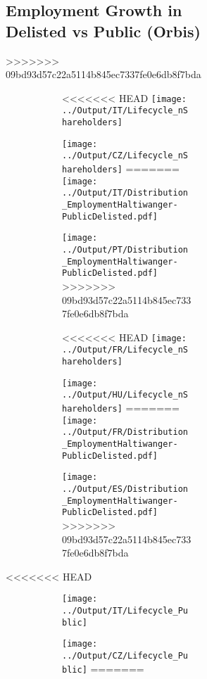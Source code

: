 \documentclass[12pt,notitlepage]{article}
\begin{document}
\begin{figure}[!htpb]
\begin{subfigure}{.49\textwidth}
\subsection{Employment Growth in Delisted vs Public (Orbis)}
>>>>>>> 09bd93d57c22a5114b845ec7337fe0e6db8f7bda
\begin{figure}[!htpb]
\centering
\caption{Firm age and Number of Shareholders}
\begin{subfigure}{.49\textwidth}
    \centering
<<<<<<< HEAD
 \texttt{[image: ../Output/IT/Lifecycle\_nShareholders]}
\end{subfigure}%
\begin{subfigure}{.49\textwidth}
    \centering
 \texttt{[image: ../Output/CZ/Lifecycle\_nShareholders]}
=======
 \texttt{[image: ../Output/IT/Distribution\_EmploymentHaltiwanger-PublicDelisted.pdf]}
\end{subfigure}%
\begin{subfigure}{.49\textwidth}
    \centering
 \texttt{[image: ../Output/PT/Distribution\_EmploymentHaltiwanger-PublicDelisted.pdf]}
>>>>>>> 09bd93d57c22a5114b845ec7337fe0e6db8f7bda
\end{subfigure}
\begin{subfigure}{.49\textwidth}
    \centering
<<<<<<< HEAD
 \texttt{[image: ../Output/FR/Lifecycle\_nShareholders]}
\end{subfigure}%
\begin{subfigure}{.49\textwidth}
    \centering
 \texttt{[image: ../Output/HU/Lifecycle\_nShareholders]}
=======
 \texttt{[image: ../Output/FR/Distribution\_EmploymentHaltiwanger-PublicDelisted.pdf]}
\end{subfigure}%
\begin{subfigure}{.49\textwidth}
    \centering
 \texttt{[image: ../Output/ES/Distribution\_EmploymentHaltiwanger-PublicDelisted.pdf]}
>>>>>>> 09bd93d57c22a5114b845ec7337fe0e6db8f7bda
\end{subfigure}
\end{figure}
\pagebreak

<<<<<<< HEAD

\begin{figure}[!htpb]
\centering
\caption{Distribution of Public Firms across age}
\begin{subfigure}{.49\textwidth}
    \centering
 \texttt{[image: ../Output/IT/Lifecycle\_Public]}
\end{subfigure}%
\begin{subfigure}{.49\textwidth}
    \centering
 \texttt{[image: ../Output/CZ/Lifecycle\_Public]}
=======



\end{subfigure}
\end{figure}
\end{subfigure}
\end{figure}
\end{document}
